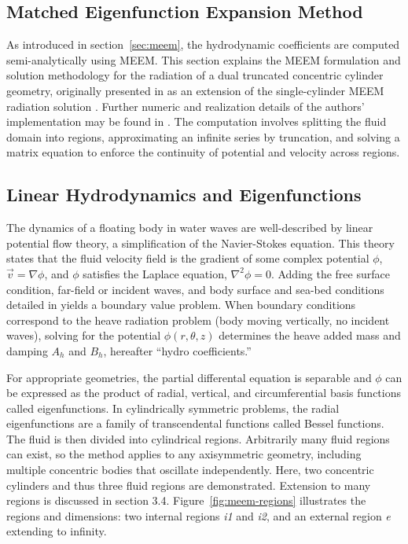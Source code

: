 \begin{appendices}
\section{Matched Eigenfunction Expansion Method}
\label{sec:MEEM_details}
As introduced in section~\ref{sec:meem}, the hydrodynamic coefficients are computed semi-analytically using MEEM. This section explains the MEEM formulation and solution methodology for the radiation of a dual truncated concentric cylinder geometry, originally presented in \cite{mavrakos_hydrodynamic_2004,chau_inertia_2010,chau_inertia_2012} as an extension of the single-cylinder MEEM radiation solution \cite{yeung_added_1981}. Further numeric and realization details of the authors' implementation may be found in \cite{mccabe_investigating_2025,khanal_openflash_2025,mccabe_open-source_2024}. The computation involves splitting the fluid domain into regions, approximating an infinite series by truncation, and solving a matrix equation to enforce the continuity of potential and velocity across regions. 

\subsection{Linear Hydrodynamics and Eigenfunctions}
The dynamics of a floating body in water waves are well-described by linear potential flow theory, a simplification of the Navier-Stokes equation. This theory states that the fluid velocity field  is the gradient of some complex potential $\phi$, $\vec{v}=\nabla\phi$, and $\phi$ satisfies the Laplace equation, $\nabla^2\phi=0$. Adding the free surface condition, far-field or incident waves, and body surface and sea-bed conditions detailed in \cite{chatjigeorgiou_analytical_2018} yields a boundary value problem. When boundary conditions correspond to the heave radiation problem (body moving vertically, no incident waves), solving for the potential $\phi(r,\theta,z)$ determines the heave added mass and damping $A_h$ and $B_h$, hereafter ``hydro coefficients.”

For appropriate geometries, the partial differental equation is separable and $\phi$ can be expressed as the product of radial, vertical, and circumferential basis functions called eigenfunctions. In cylindrically symmetric problems, the radial eigenfunctions are a family of transcendental functions called Bessel functions. The fluid is then divided into cylindrical regions. Arbitrarily many fluid regions can exist, so the method applies to any axisymmetric geometry, including multiple concentric bodies that oscillate independently. Here, two concentric cylinders and thus three fluid regions are demonstrated. Extension to many regions is discussed in section 3.4. Figure~\ref{fig:meem-regions} illustrates the regions and dimensions: two internal regions \textit{i1} and \textit{i2}, and an external region \textit{e} extending to infinity.


\end{appendices}
